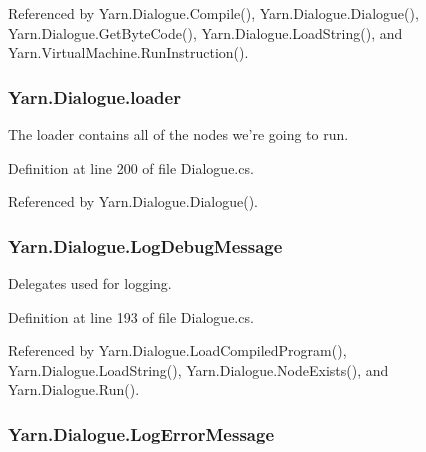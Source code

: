 Referenced by Yarn.\-Dialogue.\-Compile(), Yarn.\-Dialogue.\-Dialogue(), Yarn.\-Dialogue.\-Get\-Byte\-Code(), Yarn.\-Dialogue.\-Load\-String(), and Yarn.\-Virtual\-Machine.\-Run\-Instruction().

\hypertarget{a00092_a98bbe0ac2ccadeeeb7e05e3e6e19f2e0}{
\subsubsection[{loader}]{ Yarn.\-Dialogue.\-loader\hspace{0.3cm}{\ttfamily [package]}}}\label{a00092_a98bbe0ac2ccadeeeb7e05e3e6e19f2e0}


The loader contains all of the nodes we're going to run. 



Definition at line 200 of file Dialogue.\-cs.



Referenced by Yarn.\-Dialogue.\-Dialogue().

\hypertarget{a00092_a381f48bb0fbb294f8cf44ca57f11be31}{
\subsubsection[{Log\-Debug\-Message}]{ Yarn.\-Dialogue.\-Log\-Debug\-Message}}\label{a00092_a381f48bb0fbb294f8cf44ca57f11be31}


Delegates used for logging. 



Definition at line 193 of file Dialogue.\-cs.



Referenced by Yarn.\-Dialogue.\-Load\-Compiled\-Program(), Yarn.\-Dialogue.\-Load\-String(), Yarn.\-Dialogue.\-Node\-Exists(), and Yarn.\-Dialogue.\-Run().

\hypertarget{a00092_a9801e83dd044d6498fdf6ebcc6bec5ac}{
\subsubsection[{Log\-Error\-Message}]{ Yarn.\-Dialogue.\-Log\-Error\-Message}}\label{a00092_a9801e83dd044d6498fdf6ebcc6bec5ac}


